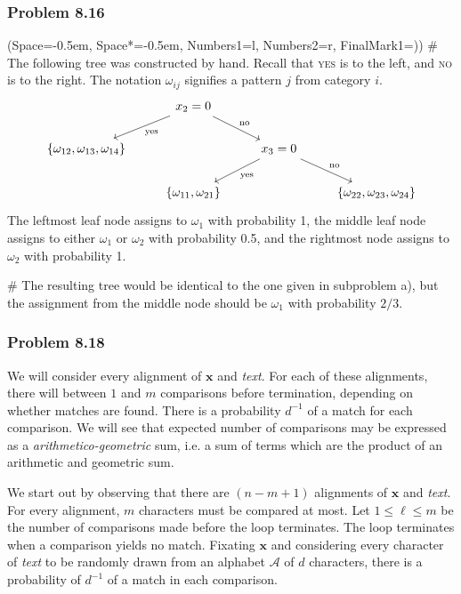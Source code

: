 \documentclass[12pt, a4paper]{article}
\newcommand{\listSpace}{-0.5em}%
\newcommand{\vect}[1]{\bm{#1}}
\begin{document}
{\subsubsection*{Problem 8.16}
\begin{easylist}[enumerate]
	\ListProperties(Space=\listSpace, Space*=\listSpace, Numbers1=l, Numbers2=r, FinalMark1={)})
	# The following tree was constructed by hand. Recall that \textsc{yes} is to the left, and \textsc{no} is to the right.
	The notation $\omega_{ij}$ signifies a pattern $j$ from category $i$.
	\begin{equation*}
	\begin{tikzcd}
	 & x_2 =0 \arrow{dr}{\text{no}} \arrow{dl}{\text{yes}} &  &  \\
	\{\omega_{12}, \omega_{13}, \omega_{14}\} &  & x_3 = 0 \arrow{dr}{\text{no}} \arrow{dl}{\text{yes}} &  \\
	 & \{\omega_{11}, \omega_{21}\} &  & \{\omega_{22}, \omega_{23}, \omega_{24}\} 
	\end{tikzcd}
	\end{equation*}
	The leftmost leaf node assigns to $\omega_1$ with probability 1, the middle leaf node assigns to either $\omega_1$ or $\omega_2$ with probability 0.5, and the rightmost node assigns to $\omega_2$ with probability 1.
	
	# The resulting tree would be identical to the one given in subproblem a), but the assignment from the middle node should be $\omega_1$ with probability $2/3$.
	
\end{easylist}



\subsubsection*{Problem 8.18}
We will consider every alignment of $\vect{x}$ and \emph{text}.
For each of these alignments, there will between $1$ and $m$ comparisons before termination, depending on whether matches are found.
There is a probability $d^{-1}$ of a match for each comparison.
We will see that expected number of comparisons may be expressed as a \emph{arithmetico-geometric} sum, i.e. a sum of terms which are the product of an arithmetic and geometric sum.

We start out by observing that there are $(n - m + 1)$ alignments of $\vect{x}$ and \emph{text}.
For every alignment, $m$ characters must be compared at most.
Let $1 \leq  \ell \leq m$ be the number of comparisons made before the loop terminates.
The loop terminates when a comparison yields no match.
Fixating $\vect{x}$ and considering every character of \emph{text} to be randomly drawn from an alphabet $\mathcal{A}$ of $d$ characters, there is a probability of $d^{-1}$ of a match in each comparison.

}
\end{document}
